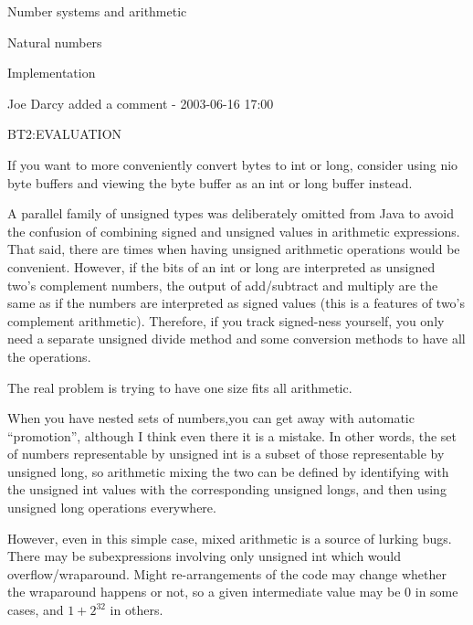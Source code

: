 \documentclass[12pt]{PalisadesLakesBook}
\begin{document}
\begin{plSection}{Number systems and arithmetic}
\begin{plSection}{Natural numbers}
\begin{plSection}{Implementation}
\begin{plQuote}
{Joe Darcy added a comment - 2003-06-16 17:00

BT2:EVALUATION

If you want to more conveniently convert bytes to int or long, 
consider using nio byte buffers and viewing the byte buffer 
as an int or long buffer instead.

A parallel family of unsigned types was deliberately 
omitted from Java to avoid the confusion 
of combining signed and unsigned values in arithmetic expressions. 
That said, there are times
 when having unsigned arithmetic operations would be convenient. 
 However, if the bits of an int or long are interpreted 
 as unsigned two's complement numbers, 
 the output of add/subtract and multiply are 
 the same as if the numbers are interpreted as signed values 
 (this is a features of two's complement arithmetic). 
 Therefore, if you track signed-ness yourself, 
 you only need a separate unsigned divide method 
 and some conversion methods to have all the operations.}
\end{plQuote}

The real problem is trying to have one size fits all arithmetic.

When you have nested sets of numbers,you can get away with
automatic ``promotion'', 
although I think even there it is a mistake.
In other words, the set of numbers representable by
{\javaFont unsigned int} is a subset of those
representable by {\javaFont unsigned long},
so arithmetic mixing the two can be defined by identifying
with the {\javaFont unsigned int} values 
with the corresponding {\javaFont unsigned long}s,
and then using {\javaFont unsigned long} operations everywhere.

However, even in this simple case, mixed arithmetic is 
a source of lurking bugs.
There may be subexpressions involving only 
{\javaFont unsigned int} which would overflow/wraparound.
Might re-arrangements of the code may change whether the
wraparound happens or not, so a given intermediate value
may be $0$ in some cases, and $1+2^{32}$ in others.


\end{plSection}
\end{plSection}
\end{plSection}
\end{document}
